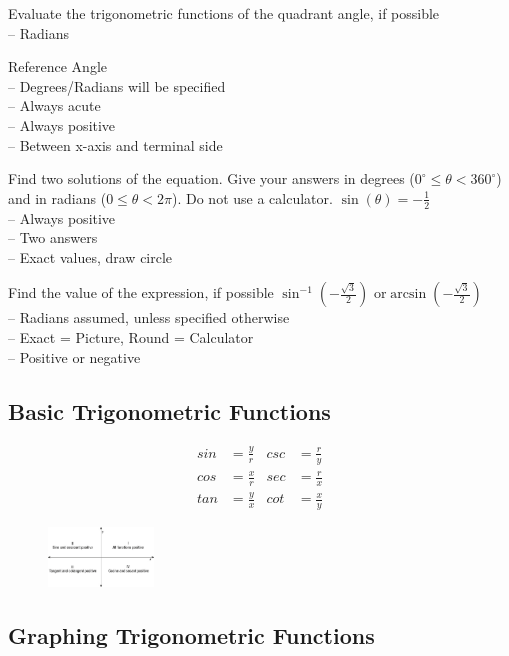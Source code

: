 \documentclass[twocolumn]{article}
\begin{document}
Evaluate the trigonometric functions of the quadrant angle, if possible \\
\indent -- Radians

\noindent Reference Angle \\
\indent -- Degrees/Radians will be specified \\
\indent -- Always acute \\
\indent -- Always positive \\
\indent -- Between x-axis and terminal side

\noindent Find two solutions of the equation. Give your answers in degrees ($ 0^\circ \le \theta < 360^\circ $) and in radians ($ 0 \le \theta < 2\pi $). Do not use a calculator. $ \sin(\theta) = -\frac{1}{2} $ \\
\indent -- Always positive \\
\indent -- Two answers \\
\indent -- Exact values, draw circle

\noindent Find the value of the expression, if possible $ \sin^{-1}(-\frac{\sqrt{3}}{2}) \text{ or}  \arcsin(-\frac{\sqrt{3}}{2}) $ \\
\indent -- Radians assumed, unless specified otherwise \\
\indent -- Exact = Picture, Round = Calculator \\
\indent -- Positive or negative

\subsection*{Basic Trigonometric Functions}
\begin{align*}
	sin &= \frac{y}{r}  & csc &= \frac{r}{y} \\
	cos &= \frac{x}{r} & sec &= \frac{r}{x} \\
	tan &= \frac{y}{x} & cot &= \frac{x}{y}
\end{align*}

\begin{figure}[h]
	\centering
	\includegraphics[width=0.25\textwidth]{positive_quadrants.jpg}
\end{figure}

\subsection*{Graphing Trigonometric Functions}
\end{document}
